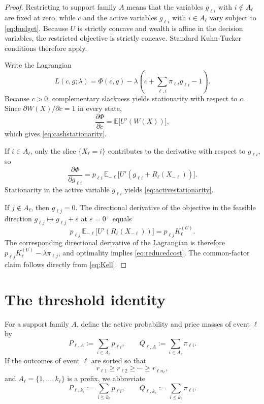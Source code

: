 \documentclass[11pt]{article}
\newcommand{\E}{\mathbb{E}}
\begin{document}
\begin{proof}
Restricting to support family $A$ means that the variables $g_{\ell i}$ with $i\notin A_\ell$ are fixed at zero, while $c$ and the active variables $g_{\ell i}$ with $i\in A_\ell$ vary subject to \eqref{eq:budget}. Because $U$ is strictly concave and wealth is affine in the decision variables, the restricted objective is strictly concave. Standard Kuhn-Tucker conditions therefore apply.

Write the Lagrangian
\[
  L(c,g;\lambda)=\Phi(c,g)-\lambda\left(c+\sum_{\ell,i}\pi_{\ell i}g_{\ell i}-1\right).
\]
Because $c>0$, complementary slackness yields stationarity with respect to $c$. Since $\partial W(X)/\partial c=1$ in every state,
\[
  \frac{\partial \Phi}{\partial c}=\E\bigl[U'(W(X))\bigr],
\]
which gives \eqref{eq:cashstationarity}.

If $i\in A_\ell$, only the slice $\{X_\ell=i\}$ contributes to the derivative with respect to $g_{\ell i}$, so
\[
  \frac{\partial \Phi}{\partial g_{\ell i}}
  =p_{\ell i}\,\E_{-\ell}\bigl[U'(g_{\ell i}+R_\ell(X_{-\ell}))\bigr].
\]
Stationarity in the active variable $g_{\ell i}$ yields \eqref{eq:activestationarity}.

If $j\notin A_\ell$, then $g_{\ell j}=0$. The directional derivative of the objective in the feasible direction $g_{\ell j}\mapsto g_{\ell j}+\varepsilon$ at $\varepsilon=0^+$ equals
\[
  p_{\ell j}\,\E_{-\ell}\bigl[U'(R_\ell(X_{-\ell}))\bigr]=p_{\ell j}K_\ell^{(U)}.
\]
The corresponding directional derivative of the Lagrangian is therefore $p_{\ell j}K_\ell^{(U)}-\lambda\pi_{\ell j}$, and optimality implies \eqref{eq:reducedcost}. The common-factor claim follows directly from \eqref{eq:Kell}.
\end{proof}

\section{The threshold identity}
For a support family $A$, define the active probability and price masses of event $\ell$ by
\begin{equation}\label{eq:PQgeneral}
  P_{\ell,A}:=\sum_{i\in A_\ell}p_{\ell i},
  \qquad
  Q_{\ell,A}:=\sum_{i\in A_\ell}\pi_{\ell i}.
\end{equation}
If the outcomes of event $\ell$ are sorted so that
\[
  r_{\ell 1}\ge r_{\ell 2}\ge \cdots \ge r_{\ell n_\ell},
\]
and $A_\ell=\{1,\dots,k_\ell\}$ is a prefix, we abbreviate
\[
  P_{\ell,k_\ell}:=\sum_{i\le k_\ell}p_{\ell i},
  \qquad
  Q_{\ell,k_\ell}:=\sum_{i\le k_\ell}\pi_{\ell i}.
\]
\end{document}
